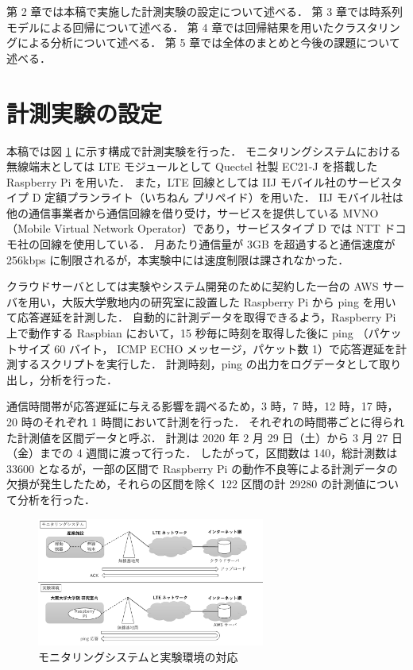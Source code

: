 \documentclass[technicalreport]{ieicej}
\begin{document}
第 2 章では本稿で実施した計測実験の設定について述べる．
第 3 章では時系列モデルによる回帰について述べる．
第 4 章では回帰結果を用いたクラスタリングによる分析について述べる．
第 5 章では全体のまとめと今後の課題について述べる．
\section{計測実験の設定}
本稿では図 \ref{exp} に示す構成で計測実験を行った．
モニタリングシステムにおける無線端末としては LTE モジュールとして Quectel 社製 EC21-J を搭載した Raspberry Pi を用いた．
また，LTE 回線としては IIJ モバイル社のサービスタイプ D 定額プランライト（いちねん プリペイド）を用いた．
IIJ モバイル社は他の通信事業者から通信回線を借り受け，サービスを提供している MVNO（Mobile Virtual Network Operator）であり，サービスタイプ D では NTT ドコモ社の回線を使用している．
月あたり通信量が 3GB を超過すると通信速度が 256kbps に制限されるが，本実験中には速度制限は課されなかった．

クラウドサーバとしては実験やシステム開発のために契約した一台の AWS サーバを用い，大阪大学敷地内の研究室に設置した Raspberry Pi から ping を用いて応答遅延を計測した．
自動的に計測データを取得できるよう，Raspberry Pi 上で動作する Raspbian において，15 秒毎に時刻を取得した後に ping （パケットサイズ 60 バイト， ICMP ECHO メッセージ，パケット数 1）で応答遅延を計測するスクリプトを実行した．
計測時刻，ping の出力をログデータとして取り出し，分析を行った．

通信時間帯が応答遅延に与える影響を調べるため，3 時，7 時，12 時，17 時，20 時のそれぞれ 1 時間において計測を行った．
それぞれの時間帯ごとに得られた計測値を区間データと呼ぶ．
計測は 2020 年 2 月 29 日（土）から 3 月 27 日（金）までの 4 週間に渡って行った．
したがって，区間数は 140，総計測数は 33600 となるが，一部の区間で Raspberry Pi の動作不良等による計測データの欠損が発生したため，それらの区間を除く 122 区間の計 29280 の計測値について分析を行った．

\begin{figure}[tb]
\centering
\includegraphics[width=7.5cm]{./figure/experiment.pdf}
\caption{モニタリングシステムと実験環境の対応}
\label{exp}
\end{figure}
\end{document}
